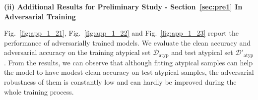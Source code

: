 
\newpage
\textbf{(ii) Additional Results for Preliminary Study - Section~\ref{sec:pre1} In Adversarial Training}

Fig.~\ref{fig:app_1_21}, Fig.~\ref{fig:app_1_22} and Fig.~\ref{fig:app_1_23} report the performance of adversarially trained models. We evaluate the clean accuracy and adversarial accuracy on the training atypical set $\mathcal{D}_\text{atyp}$ and test atypical set $\mathcal{D}'_\text{atyp}$. From the results, we can observe that although fitting atypical samples can help the model to have modest clean accuracy on test atypical samples, the adversarial robustness of them is constantly low and can hardly be improved during the whole training process.


